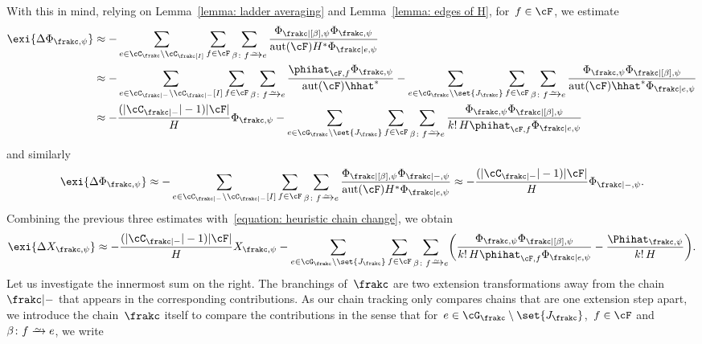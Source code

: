 \documentclass[11pt]{amsart}
\DeclarePairedDelimiter{\paren}{\lparen}{\rparen}
\DeclarePairedDelimiter{\abs}{\lvert}{\rvert}
\newcommand{\bijection}{\mathchoice
	{\xrightarrow{\smash{\raisebox{-3pt}{$\scriptstyle\sim$}}}}%
	{\xrightarrow{\smash{\raisebox{-3pt}{$\scriptstyle\sim$}}}}%
	{\xrightarrow{\smash{\raisebox{-2.5pt}{$\scriptscriptstyle\sim$}}}}%
	{\xrightarrow{\smash{\raisebox{-2.5pt}{$\scriptscriptstyle\sim$}}}}%
}
\DeclareMathOperator{\aut}{aut}
\newcommand{\om}{\mathord{-}}
\theoremstyle{definition}
\numberwithin{equation}{section}
\begin{document}
	With this in mind, relying on Lemma~\ref{lemma: ladder averaging} and Lemma~\ref{lemma: edges of H}, for~$f\in\cF$, we estimate
	\begin{equation*}
		\begin{aligned}
			\exi{\Delta \Phi_{\frakc,\psi}}
			&\approx-\sum_{e\in \cC_{\frakc}\setminus\cC_\frakc[I]}\sum_{f\in\cF}\sum_{\beta\colon f\bijection e}\frac{\Phi_{\frakc|[\beta],\psi}\Phi_{\frakc,\psi}}{\aut(\cF)H^*\Phi_{\frakc|e,\psi}}\\
			&\approx -\sum_{e\in \cC_{\frakc|-}\setminus\cC_{\frakc|-}[I]}\sum_{f\in\cF}\sum_{\beta\colon f\bijection e}\frac{\phihat_{\cF,f}\Phi_{\frakc,\psi}}{\aut(\cF)\hhat^*}-\sum_{e\in \cG_\frakc\setminus\set{J_\frakc}}\sum_{f\in\cF}\sum_{\beta\colon f\bijection e}\frac{\Phi_{\frakc,\psi}\Phi_{\frakc|[\beta],\psi}}{\aut(\cF)\hhat^*\Phi_{\frakc|e,\psi}}\\
			&\approx -\frac{(\abs{\cC_{\frakc|-}}-1)\abs{\cF}}{H}\Phi_{\frakc,\psi}-\sum_{e\in \cG_\frakc\setminus\set{J_\frakc}}\sum_{f\in\cF}\sum_{\beta\colon f\bijection e}\frac{\Phi_{\frakc,\psi}\Phi_{\frakc|[\beta],\psi}}{k!\,H\phihat_{\cF,f}\Phi_{\frakc|e,\psi}}
		\end{aligned}
	\end{equation*}
	and similarly
	\begin{equation*}
			\exi{\Delta \Phi_{\frakc,\psi}}
			\approx-\sum_{e\in \cC_{\frakc|-}\setminus\cC_{\frakc|-}[I]}\sum_{f\in\cF}\sum_{\beta\colon f\bijection e}\frac{\Phi_{\frakc|[\beta],\psi}\Phi_{\frakc|-,\psi}}{\aut(\cF)H^*\Phi_{\frakc|e,\psi}}
			\approx -\frac{(\abs{\cC_{\frakc|-}}-1)\abs{\cF}}{H}\Phi_{\frakc|-,\psi}.
	\end{equation*}
	Combining the previous three estimates with~\eqref{equation: heuristic chain change}, we obtain
	\begin{equation*}
		\exi{\Delta X_{\frakc,\psi}}
		\approx -\frac{(\abs{\cC_{\frakc|\om}}-1)\abs{\cF}}{H}X_{\frakc,\psi}-\sum_{e\in\cG_\frakc\setminus\set{J_\frakc}}\sum_{f\in\cF}\sum_{\beta\colon f\bijection e}\paren[\bigg]{\frac{\Phi_{\frakc,\psi}\Phi_{\frakc|[\beta],\psi}}{k!\,H\phihat_{\cF,f}\Phi_{\frakc|e,\psi}}-\frac{\Phihat_{\frakc,\psi}}{k!\,H}}.
	\end{equation*}
	Let us investigate the innermost sum on the right.
	The branchings of~$\frakc$ are two extension transformations away from the chain~$\frakc|-$ that appears in the corresponding contributions.
	As our chain tracking only compares chains that are one extension step apart, we introduce the chain~$\frakc$ itself to compare the contributions in the sense that for~$e\in\cG_\frakc\setminus\set{J_\frakc}$,~$f\in\cF$ and~$\beta\colon f\bijection e$, we write
\end{document}
